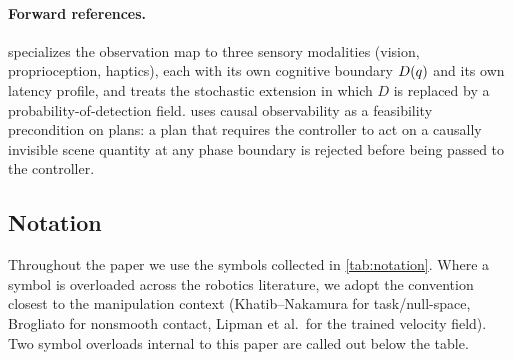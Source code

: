 \paragraph{Forward references.}
 specializes the observation map to three
sensory modalities (vision, proprioception, haptics), each with
its own cognitive boundary $D(q)$ and its own latency
profile, and treats the stochastic extension in which $D$ is
replaced by a probability-of-detection field.
 uses causal observability as a
feasibility precondition on plans: a plan that requires the
controller to act on a causally invisible scene quantity at any
phase boundary is rejected before being passed to the
controller.

\subsection{Notation}
\label{sec:notation}

Throughout the paper we use the symbols collected in
\cref{tab:notation}. Where a symbol is overloaded across the
robotics literature, we adopt the convention closest to the
manipulation context (Khatib--Nakamura for task/null-space,
Brogliato for nonsmooth contact, Lipman et al.\ for the trained
velocity field). Two symbol overloads internal to this paper are
called out below the table.

